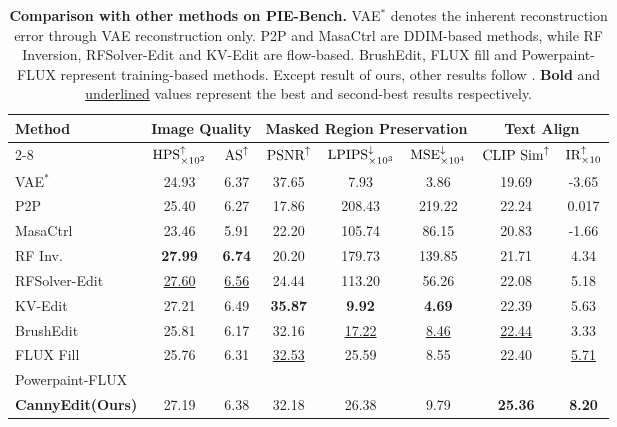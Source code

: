 \documentclass{article}
\begin{document}
\begin{table}[h]

\begin{center} 
\footnotesize
\setlength{\tabcolsep}{1.85mm} %
\caption{\textbf{Comparison with other methods on PIE-Bench.} VAE$^*$ denotes the inherent reconstruction error through VAE reconstruction only. P2P and MasaCtrl are DDIM-based methods, while RF Inversion, RFSolver-Edit and KV-Edit are flow-based. BrushEdit, FLUX fill and Powerpaint-FLUX represent training-based methods. Except result of ours, other results follow \cite{zhu2025kv}. \textbf{Bold} and \underline{underlined} values represent the best and second-best results respectively.}
\begin{tabular}{l|cc|ccc|cc}
\toprule
\multirow{3}{*}[0.8ex]{Method} & \multicolumn{2}{c|}{Image Quality} & \multicolumn{3}{c|}{Masked Region Preservation} &\multicolumn{2}{c}{Text Align} \\
\cmidrule(lr){2-8} & $\textup{HPS}_{\times 10^2}^{\uparrow}$ & $\textup{AS}^{\uparrow}$ & $\textup{PSNR}^\uparrow$ & $\textup{LPIPS}_{\times 10^3}^{\downarrow}$ & $\textup{MSE}_{\times 10^4}^{\downarrow}$ & $\textup{CLIP Sim}^{\uparrow}$ & $\textup{IR}_{\times10}^{\uparrow}$\\
\midrule
VAE$^*$ & 24.93 & 6.37 & 37.65 & 7.93 & 3.86 & 19.69 & -3.65\\
\midrule
P2P~\cite{hertz2022prompt} & 25.40 & 6.27& 17.86 & 208.43 & 219.22 & 22.24 & 0.017 \\
MasaCtrl~\cite{cao2023masactrl} & 23.46 & 5.91 & 22.20 & 105.74 & 86.15 & 20.83 & -1.66\\
RF Inv.~\cite{rout2024semantic} & \textbf{27.99} & \textbf{6.74} & 20.20 & 179.73 & 139.85 & 21.71 & 4.34\\
RFSolver-Edit~\cite{wang2024taming} & \underline{27.60} & \underline{6.56}& 24.44& 113.20& 56.26& 22.08& 5.18\\
KV-Edit~\cite{zhu2025kv} & 27.21 & 6.49 & \textbf{35.87}& \textbf{9.92}& \textbf{4.69}& 22.39 & 5.63\\
BrushEdit~\cite{li2024brushedit} & 25.81 & 6.17 & 32.16 & \underline{17.22} & \underline{8.46} & \underline{22.44} & 3.33\\
FLUX Fill~\cite{blackforest2024FLUX} & 25.76 & 6.31 & \underline{32.53} & 25.59 & 8.55 & 22.40 & \underline{5.71}\\
Powerpaint-FLUX~\cite{zhuang2023task} & & & & & & & \\
\midrule
\textbf{CannyEdit(Ours)} & 27.19 & 6.38 & 32.18 & 26.38 & 9.79& \textbf{25.36} & \textbf{8.20}\\
\bottomrule
\end{tabular}
\label{tab:pie-comparison} 
\end{center}
\end{table}
\end{document}
